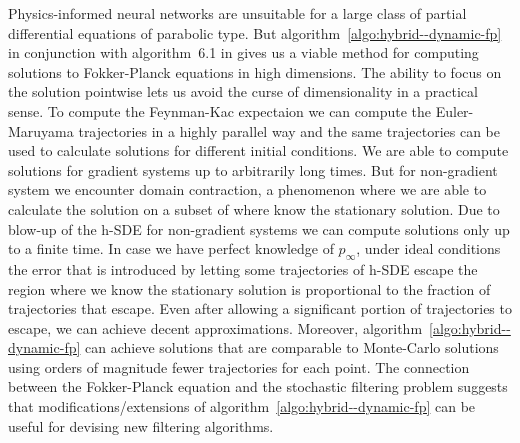 Physics-informed neural networks are unsuitable for a large class of partial differential equations of parabolic type. But algorithm~\ref{algo:hybrid--dynamic-fp} in conjunction with algorithm~6.1 in \cite{mandal2023learning} gives us a viable method for computing solutions to Fokker-Planck equations in high dimensions. The ability to focus on the solution pointwise lets us avoid the curse of dimensionality in a practical sense. To compute the Feynman-Kac expectaion we can compute the Euler-Maruyama trajectories in a highly parallel way and the same trajectories can be used to calculate solutions for different initial conditions. We are able to compute solutions for gradient systems up to arbitrarily long times. But for non-gradient system we encounter domain contraction, a phenomenon where we are able to calculate the solution on a subset of where know the stationary solution. Due to blow-up of the h-SDE for non-gradient systems we can compute solutions only up to a finite time. In case we have perfect knowledge of $p_\infty$, under ideal conditions the error that is introduced by letting some trajectories of h-SDE escape the region where we know the stationary solution is proportional to the fraction of trajectories that escape. Even after allowing a significant portion of trajectories to escape, we can achieve decent approximations. Moreover, algorithm~\ref{algo:hybrid--dynamic-fp} can achieve solutions that are comparable to Monte-Carlo solutions using orders of magnitude fewer trajectories for each point. The connection between the Fokker-Planck equation and the stochastic filtering problem suggests that modifications/extensions of algorithm~\ref{algo:hybrid--dynamic-fp} can be useful for devising new filtering algorithms.